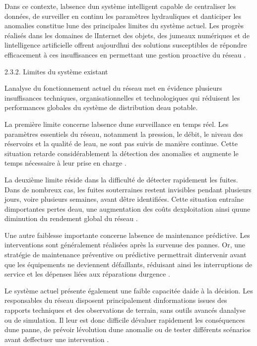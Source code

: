 \documentclass[12pt,a4paper,oneside]{report}
\begin{document}
Dans ce contexte, l\textquotesingle absence d\textquotesingle un système
intelligent capable de centraliser les données, de surveiller en continu
les paramètres hydrauliques et d\textquotesingle anticiper les anomalies
constitue l\textquotesingle une des principales limites du système
actuel. Les progrès réalisés dans les domaines de
l\textquotesingle Internet des objets, des jumeaux numériques et de
l\textquotesingle intelligence artificielle offrent
aujourd\textquotesingle hui des solutions susceptibles de répondre
efficacement à ces insuffisances en permettant une gestion proactive du
réseau \cite{ref60}.

2.3.2. Limites du système existant

L\textquotesingle analyse du fonctionnement actuel du réseau met en
évidence plusieurs insuffisances techniques, organisationnelles et
technologiques qui réduisent les performances globales du système de
distribution d\textquotesingle eau potable.

La première limite concerne l\textquotesingle absence
d\textquotesingle une surveillance en temps réel. Les paramètres
essentiels du réseau, notamment la pression, le débit, le niveau des
réservoirs et la qualité de l\textquotesingle eau, ne sont pas suivis de
manière continue. Cette situation retarde considérablement la détection
des anomalies et augmente le temps nécessaire à leur prise en charge
\cite{ref20}.

La deuxième limite réside dans la difficulté de détecter rapidement les
fuites. Dans de nombreux cas, les fuites souterraines restent invisibles
pendant plusieurs jours, voire plusieurs semaines, avant
d\textquotesingle être identifiées. Cette situation entraîne
d\textquotesingle importantes pertes d\textquotesingle eau, une
augmentation des coûts d\textquotesingle exploitation ainsi
qu\textquotesingle une diminution du rendement global du réseau
\cite{ref11}.

Une autre faiblesse importante concerne l\textquotesingle absence de
maintenance prédictive. Les interventions sont généralement réalisées
après la survenue des pannes. Or, une stratégie de maintenance
préventive ou prédictive permettrait d\textquotesingle intervenir avant
que les équipements ne deviennent défaillants, réduisant ainsi les
interruptions de service et les dépenses liées aux réparations
d\textquotesingle urgence \cite{ref100}.

Le système actuel présente également une faible capacitée
d\textquotesingle aide à la décision. Les responsables du réseau
disposent principalement d\textquotesingle informations issues des
rapports techniques et des observations de terrain, sans outils avancés
d\textquotesingle analyse ou de simulation. Il leur est donc difficile
d\textquotesingle évaluer rapidement les conséquences
d\textquotesingle une panne, de prévoir l\textquotesingle évolution
d\textquotesingle une anomalie ou de tester différents scénarios avant
d\textquotesingle effectuer une intervention \cite{ref37}.
\end{document}
